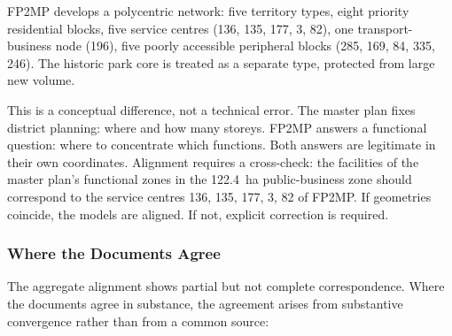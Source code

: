 FP2MP develops a polycentric network: five territory types, eight priority residential blocks, five service centres (136, 135, 177, 3, 82), one transport-business node (196), five poorly accessible peripheral blocks (285, 169, 84, 335, 246). The historic park core is treated as a separate type, protected from large new volume.
 
This is a conceptual difference, not a technical error. The master plan fixes district planning: where and how many storeys. FP2MP answers a functional question: where to concentrate which functions. Both answers are legitimate in their own coordinates. Alignment requires a cross-check: the facilities of the master plan's functional zones in the 122.4~ha public-business zone should correspond to the service centres 136, 135, 177, 3, 82 of FP2MP. If geometries coincide, the models are aligned. If not, explicit correction is required.
 
\subsubsection{Where the Documents Agree}
\label{sec:comparison-agreements}
 
The aggregate alignment shows partial but not complete correspondence. Where the documents agree in substance, the agreement arises from substantive convergence rather than from a common source:
 
